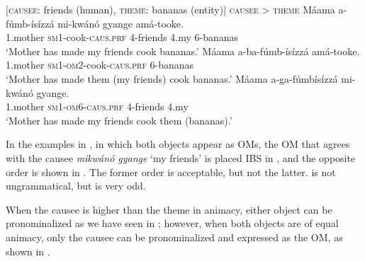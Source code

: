 \documentclass[output=paper,
            colorlinks, citecolor=brown
            ,draftmode
		  ]{langscibook}
\begin{document}
\ea%
    \label{ex:yoneda:36}
    [\textsc{causee}: friends (human), \textsc{theme}: bananas (entity)]  \textsc{causee} > \textsc{theme}
    \ea\label{ex:yoneda:36a}\gll Máama     a-fúmb-ísízzá           mi-kwánó   gyange   amá-tooke.\\
         1.mother    \textsc{sm1}-cook-\textsc{caus.prf}    4-friends    4.my    6-bananas\\
    \glt ‘Mother has made my friends cook bananas.’
    \ex\label{ex:yoneda:36b}\gll Máama     a-ba-fúmb-ísízzá               amá-tooke.\\
    1.mother    \textsc{sm1-om2}-cook-\textsc{caus.prf}    6-bananas\\
    \glt ‘Mother has made them (my friends) cook bananas.’
    \ex\label{ex:yoneda:36c} \gll Máama     a-ga-fúmbísízzá         mi-kwánó   gyange.\\
    1.mother    \textsc{sm1-om6-caus.prf}  4-friends    4.my\\
    \glt ‘Mother has made my friends cook them (bananas).’
    \z
\z
          


    In the examples in , in which both objects appear as OMs, the OM that agrees with the causee \textit{mikwánó gyange} ‘my friends’ is placed IBS in , and the opposite order is shown in . The former order is acceptable, but not the latter.  is not ungrammatical, but is very odd.  



\ea%
    \label{ex:yoneda:37}
    \z
\z
 

When the causee is higher than the theme in animacy, either object can be pronominalized as we have seen in ; however, when both objects are of equal animacy, only the causee can be pronominalized and expressed as the OM, as shown in . 
\end{document}
